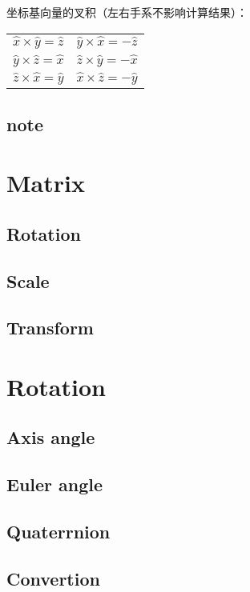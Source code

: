 \documentclass[11pt,a4paper]{report}
\begin{document}
坐标基向量的叉积（左右手系不影响计算结果）：

\begin{center}
\begin{tabular}{cc}
$\hat{x} \times \hat{y} = \hat{z}$ & $ \hat{y} \times \hat{x} = -\hat{z}$ \\
$\hat{y} \times \hat{z} = \hat{x}$ & $ \hat{z} \times \hat{y} = -\hat{x}$ \\
$\hat{z} \times \hat{x} = \hat{y}$ & $ \hat{x} \times \hat{z} = -\hat{y}$ 
\end{tabular}
\end{center}


\section{note}

\chapter{Matrix}
\section{Rotation}
\section{Scale}
\section{Transform}

\chapter{Rotation}
\section{Axis angle}
\section{Euler angle}
\section{Quaterrnion}
\section{Convertion}
\end{document}
